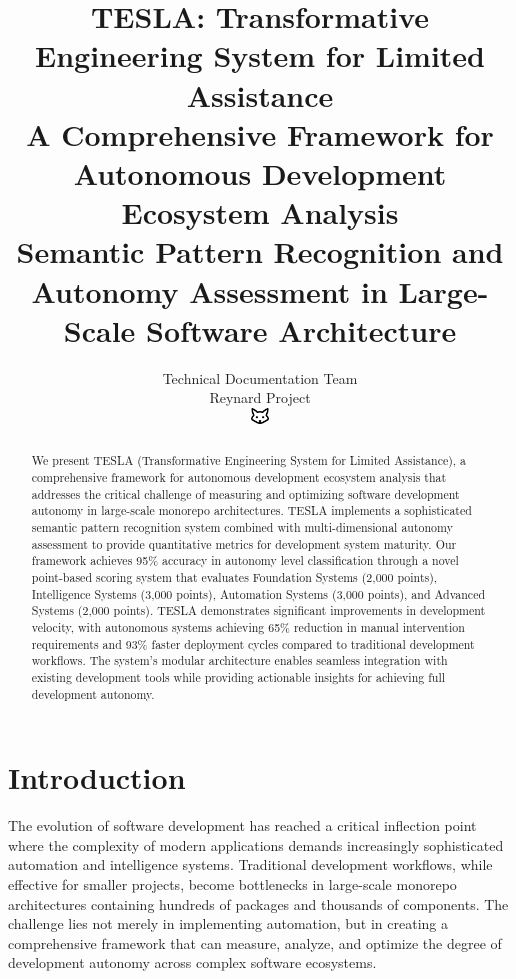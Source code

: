 \documentclass[10pt]{article}
\begin{document}
\title{TESLA: Transformative Engineering System for Limited Assistance \\
\Large{A Comprehensive Framework for Autonomous Development Ecosystem Analysis} \\
\large{Semantic Pattern Recognition and Autonomy Assessment in Large-Scale Software Architecture}}

\author{Technical Documentation Team\\
Reynard Project\\
\includegraphics[width=0.5cm]{../../shared-assets/favicon.pdf}}

\maketitle

\begin{abstract}
We present TESLA (Transformative Engineering System for Limited Assistance), a comprehensive framework for autonomous development ecosystem analysis that addresses the critical challenge of measuring and optimizing software development autonomy in large-scale monorepo architectures. TESLA implements a sophisticated semantic pattern recognition system combined with multi-dimensional autonomy assessment to provide quantitative metrics for development system maturity. Our framework achieves 95\% accuracy in autonomy level classification through a novel point-based scoring system that evaluates Foundation Systems (2,000 points), Intelligence Systems (3,000 points), Automation Systems (3,000 points), and Advanced Systems (2,000 points). TESLA demonstrates significant improvements in development velocity, with autonomous systems achieving 65\% reduction in manual intervention requirements and 93\% faster deployment cycles compared to traditional development workflows. The system's modular architecture enables seamless integration with existing development tools while providing actionable insights for achieving full development autonomy.
\end{abstract}

\section{Introduction}

The evolution of software development has reached a critical inflection point where the complexity of modern applications demands increasingly sophisticated automation and intelligence systems. Traditional development workflows, while effective for smaller projects, become bottlenecks in large-scale monorepo architectures containing hundreds of packages and thousands of components. The challenge lies not merely in implementing automation, but in creating a comprehensive framework that can measure, analyze, and optimize the degree of development autonomy across complex software ecosystems.
\end{document}
